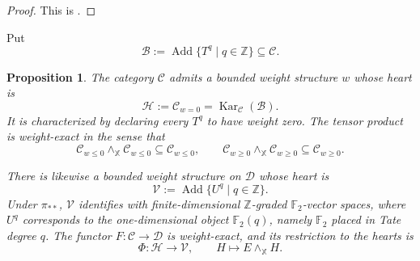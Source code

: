 \documentclass[11pt]{amsart}
\numberwithin{equation}{section}
\newtheorem{proposition}[theorem]{Proposition}
\theoremstyle{definition}
\theoremstyle{remark}
\DeclareMathOperator{\Kar}{Kar}
\DeclareMathOperator{\Add}{Add}
\newcommand{\F}{\mathbb F_2}
\newcommand{\X}{\mathbb X}
\newcommand{\C}{\mathcal C}
\newcommand{\D}{\mathcal D}
\newcommand{\Hh}{\mathcal H}
\newcommand{\V}{\mathcal V}
\newcommand{\B}{\mathcal B}
\begin{document}
\begin{proof}
This is \cite[Corollary~2.1.2]{BondarkoSosnilo}.
\end{proof}

Put
\[
  \B:=\Add\{T^q\mid q\in\mathbb Z\}\subseteq\C.
\]

\begin{proposition}
\label{prop:diagonal-weight}
The category $\C$ admits a bounded weight structure $w$ whose heart is
\[
  \Hh:=\C_{w=0}=\Kar_{\C}(\B).
\]
It is characterized by declaring every $T^q$ to have weight zero.  The tensor
product is weight-exact in the sense that
\[
  \C_{w\le0}\wedge_{\X}\C_{w\le0}\subseteq\C_{w\le0},
  \qquad
  \C_{w\ge0}\wedge_{\X}\C_{w\ge0}\subseteq\C_{w\ge0}.
\]

There is likewise a bounded weight structure on $\D$ whose heart is
\[
  \V:=\Add\{U^q\mid q\in\mathbb Z\}.
\]
Under $\pi_{**}$, $\V$ identifies with finite-dimensional
$\mathbb Z$-graded $\F$-vector spaces, where $U^q$ corresponds to the
one-dimensional object $\F(q)$, namely $\F$ placed in Tate degree $q$.
The functor $F\colon\C\to\D$ is
weight-exact, and its restriction to the hearts is
\[
  \Phi\colon\Hh\longrightarrow\V,
  \qquad H\longmapsto E\wedge_{\X}H.
\]
\end{proposition}
\end{document}
